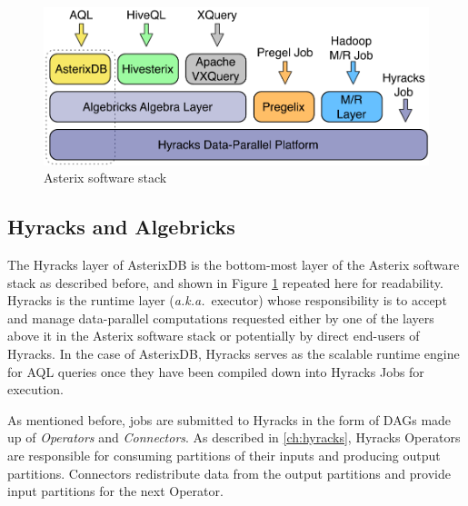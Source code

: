 \begin{figure}[htb]
\centering
\includegraphics[width=5.0in]{images/asterixdb_stack}
\caption{Asterix software stack\label{fig:stack}}
\end{figure}

\subsection{Hyracks and Algebricks}

The Hyracks layer of AsterixDB is the bottom-most layer of the Asterix software stack as described before, and shown in Figure \ref{fig:stack} repeated here for readability.
Hyracks is the runtime layer (\emph{a.k.a.}~executor) whose responsibility is to accept and manage data-parallel computations requested either by one of the layers above it in the Asterix software stack or potentially by direct end-users of Hyracks. 
In the case of AsterixDB, Hyracks serves as the scalable runtime engine for AQL queries once they have been compiled down into Hyracks Jobs for execution.

As mentioned before, jobs are submitted to Hyracks in the form of DAGs made up of \emph{Operators} and \emph{Connectors}. 
As described in \ref{ch:hyracks}, Hyracks Operators are responsible for consuming partitions of their inputs and producing output partitions. 
Connectors redistribute data from the output partitions and provide input partitions for the next Operator.

